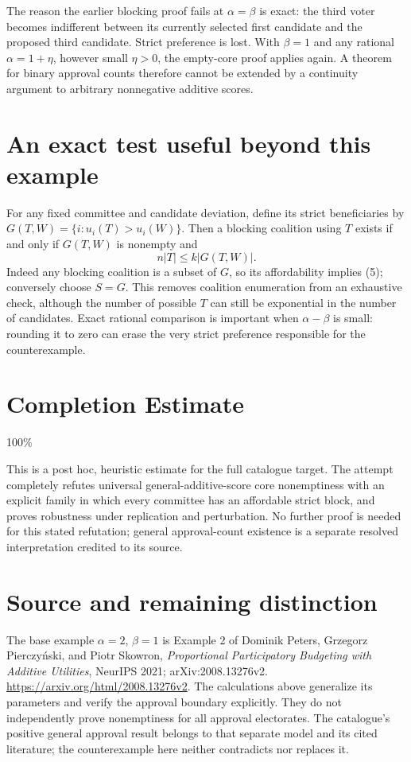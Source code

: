 \documentclass[11pt]{article}
\begin{document}
The reason the earlier blocking proof fails at $\alpha=\beta$ is exact:
the third voter becomes indifferent between its currently selected first
candidate and the proposed third candidate. Strict preference is lost.
With $\beta=1$ and any rational $\alpha=1+\eta$, however small
$\eta>0$, the empty-core proof applies again. A theorem for binary
approval counts therefore cannot be extended by a continuity argument
to arbitrary nonnegative additive scores.

\section*{An exact test useful beyond this example}
For any fixed committee and candidate deviation, define its strict
beneficiaries by $G(T,W)=\{i:u_i(T)>u_i(W)\}$. Then a blocking coalition
using $T$ exists if and only if $G(T,W)$ is nonempty and
\[
                              n|T|\leq k|G(T,W)|.                \tag{5}
\]
Indeed any blocking coalition is a subset of $G$, so its affordability
implies (5); conversely choose $S=G$. This removes coalition enumeration
from an exhaustive check, although the number of possible $T$ can still
be exponential in the number of candidates. Exact rational comparison
is important when $\alpha-\beta$ is small: rounding it to zero can erase
the very strict preference responsible for the counterexample.

\section{Completion Estimate}
100\%

This is a post hoc, heuristic estimate for the full catalogue target.
The attempt completely refutes universal general-additive-score core nonemptiness with an explicit family in which every committee has an affordable strict block, and proves robustness under replication and perturbation. No further proof is needed for this stated refutation; general approval-count existence is a separate resolved interpretation credited to its source.

\section*{Source and remaining distinction}
The base example $\alpha=2$, $\beta=1$ is Example 2 of Dominik Peters,
Grzegorz Pierczy\'nski, and Piotr Skowron,
\emph{Proportional Participatory Budgeting with Additive Utilities},
NeurIPS 2021; arXiv:2008.13276v2.
\url{https://arxiv.org/html/2008.13276v2}.
The calculations above generalize its parameters and verify the approval
boundary explicitly. They do not independently prove nonemptiness for
all approval electorates. The catalogue's positive general approval
result belongs to that separate model and its cited literature; the
counterexample here neither contradicts nor replaces it.
\end{document}
